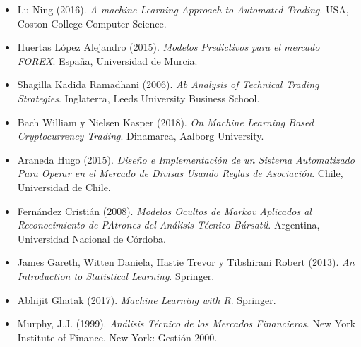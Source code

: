 \documentclass[a4paper,12pt]{Latex/Classes/PhDthesisPSnPDF}
\begin{document}
\begin{itemize}

\item Lu Ning (2016). \textit{A machine Learning Approach to Automated Trading}. USA, Coston College Computer Science.

\item Huertas López Alejandro (2015). \textit{Modelos Predictivos para el mercado FOREX}. España, Universidad de Murcia.

\item Shagilla Kadida Ramadhani (2006). \textit{Ab Analysis of Technical Trading Strategies}. Inglaterra, Leeds University Business School.

\item Bach William y Nielsen Kasper (2018). \textit{On Machine Learning Based Cryptocurrency Trading}. Dinamarca, Aalborg University.

\item Araneda Hugo (2015). \textit{Diseño e Implementación de un Sistema Automatizado Para Operar en el Mercado de Divisas Usando Reglas de Asociación}. Chile, Universidad de Chile.

\item Fernández Cristián (2008). \textit{Modelos Ocultos de Markov Aplicados al Reconocimiento de PAtrones del Análisis Técnico Búrsatil}. Argentina, Universidad Nacional de Córdoba.

\item James Gareth, Witten Daniela, Hastie Trevor y Tibshirani Robert (2013). \textit{An Introduction to Statistical Learning}. Springer.

\item Abhijit Ghatak (2017). \textit{Machine Learning with R}. Springer.

\item Murphy, J.J. (1999). \textit{Análisis Técnico de los Mercados Financieros}. New York Institute of Finance. New York: Gestión 2000.

\end{itemize}
\end{document}
